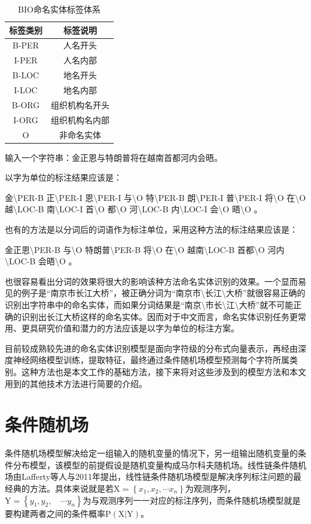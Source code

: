 \documentclass[winfonts,master,oneside,nobackinfo]{njuthesis}
\begin{document}
\begin{table}[!htbp]
\centering
\begin{tabular}{cc} %
\hline 
标签类别&标签说明\\
\hline  
B-PER&人名开头\\
I-PER&人名内部\\
B-LOC&地名开头\\
I-LOC&地名内部\\
B-ORG&组织机构名开头\\
I-ORG&组织机构名内部\\
O&非命名实体\\
\hline 
\end{tabular}
\caption{BIO命名实体标签体系}
\end{table}

输入一个字符串：金正恩与特朗普将在越南首都河内会晤。

以字为单位的标注结果应该是：

金\textbackslash PER-B 正\textbackslash PER-I 恩\textbackslash PER-I 与\textbackslash O 特\textbackslash PER-B 朗\textbackslash PER-I 普\textbackslash PER-I 将\textbackslash O 在\textbackslash O 越\textbackslash LOC-B 南\textbackslash LOC-I 首\textbackslash O 都\textbackslash O 河\textbackslash LOC-B 内\textbackslash LOC-I 会\textbackslash O 晤\textbackslash O 。

也有的方法是以分词后的词语作为标注单位，采用这种方法的标注结果应该是：

金正恩\textbackslash PER-B 与\textbackslash O 特朗普\textbackslash PER-B 将\textbackslash O 在\textbackslash O 越南\textbackslash LOC-B 首都\textbackslash O 河内\textbackslash LOC-B 会晤\textbackslash O 。

也很容易看出分词的效果将很大的影响该种方法命名实体识别的效果。一个显而易见的例子是“南京市长江大桥”，被正确分词为“南京市\textbackslash 长江\textbackslash 大桥”就很容易正确的识别出字符串中的命名实体，而如果分词结果是“南京\textbackslash 市长\textbackslash 江\textbackslash 大桥”就不可能正确的识别出长江大桥这样的命名实体。因而对于中文而言，命名实体识别任务更常用、更具研究价值和潜力的方法应该是以字为单位的标注方案。

目前较成熟较先进的命名实体识别模型是面向字符级的分布式向量表示，再经由深度神经网络模型训练，提取特征，最终通过条件随机场模型预测每个字符所属类别。这种方法也是本文工作的基础方法，接下来将对这些涉及到的模型方法和本文用到的其他技术方法进行简要的介绍。

\section{条件随机场}
条件随机场模型解决给定一组输入的随机变量的情况下，另一组输出随机变量的条件分布模型，该模型的前提假设是随机变量构成马尔科夫随机场。线性链条件随机场由Lafferty等人\cite{Lafferty}与2011年提出，线性链条件随机场模型是解决序列标注问题的最经典的方法。具体来说就是若$\mathrm { X } = \left\{ x _ { 1 } , x _ { 2 } , \cdots x _ { n } \right\}$为观测序列，$\mathrm { Y } = \left\{ y _ { 1 } , y _ { 2 } , \quad \cdots y _ { n } \right\}$为与观测序列一一对应的标注序列，而条件随机场模型就是要构建两者之间的条件概率$\mathrm { P } ( \mathrm { X } | \mathrm { Y } )$。
\end{document}
